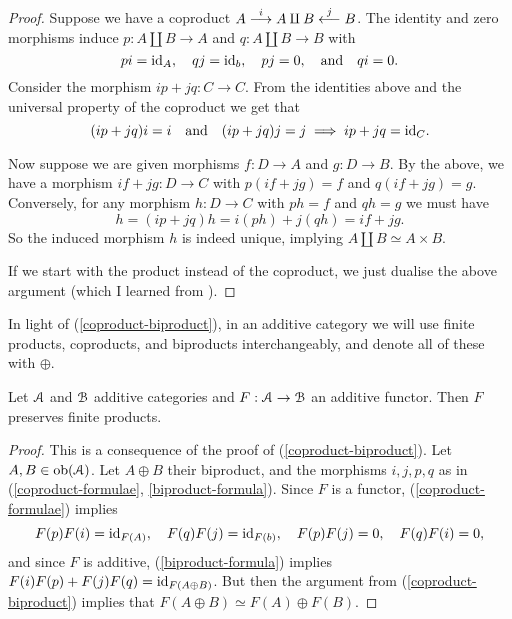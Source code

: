 \begin{proof}
  Suppose we have a coproduct $A \overset{i}{\longrightarrow} A \amalg B
  \overset{j}{\longleftarrow} B$. The identity and zero morphisms induce $p
  : A \amalg B \to A$ and $q : A \amalg B \to B$ with
  \begin{equation}
    \label{coproduct-formulae}
    pi = \mathrm{id}_A, \quad qj = \mathrm{id}_b, \quad pj = 0, \quad\text{and}\quad
    qi = 0.
  \end{equation}
  Consider the morphism $ip + jq : C \to C$. From the identities above
  and the universal property of the coproduct we get that
  \begin{equation}
    \label{biproduct-formula}
    (ip + jq)i = i \quad\text{and}\quad (ip+jq)j = j \implies ip+jq =
    \mathrm{id}_C.
  \end{equation}

  \medskip
  Now suppose we are given morphisms $f : D \to A$ and $g : D \to
  B$. By the above, we have a morphism $if + jg : D \to C$ with
  $p(if+jg) = f$ and $q(if+jg) = g$. Conversely, for any morphism $h :
  D \to C$ with $ph = f$ and $qh = g$ we must have
  \[
  h = (ip+jq)h = i(ph) + j(qh) = if + jg.
  \]
  So the induced morphism $h$ is indeed unique, implying $A \amalg B
  \simeq A \times B$.

  \medskip
  If we start with the product instead of the coproduct, we just
  dualise the above argument (which I learned from
  \cite{mo-additive-functor-direct-sum}).
\end{proof}

\begin{notation}
  In light of (\ref{coproduct-biproduct}), in an additive category we
  will use finite products, coproducts, and biproducts
  interchangeably, and denote all of these with $\oplus$.
\end{notation}

\begin{lemma}
  \label{additive-functor-preserves-products}
  Let $\mathcal{A}$ and $\mathcal{B}$ additive categories and $F : \mathcal{A} \to \mathcal{B}$ an
  additive functor. Then $F$ preserves finite products.
\end{lemma}

\begin{proof}
  This is a consequence of the proof of
  (\ref{coproduct-biproduct}). Let $A,B \in \operatorname{ob}(\mathcal{A})$. Let $A \oplus B$
  their biproduct, and the morphisms $i,j,p,q$ as in
  (\ref{coproduct-formulae}, \ref{biproduct-formula}). Since $F$ is a
  functor, (\ref{coproduct-formulae}) implies
  \[
  F(p)F(i) = \mathrm{id}_{F(A)}, \quad F(q)F(j) = \mathrm{id}_{F(b)}, \quad F(p)F(j) =
  0, \quad F(q)F(i) = 0,
  \]
  and since $F$ is additive, (\ref{biproduct-formula}) implies
  $F(i)F(p) + F(j)F(q) = \mathrm{id}_{F(A \oplus B)}$. But then the argument
  from (\ref{coproduct-biproduct}) implies that $F(A \oplus B) \simeq
  F(A) \oplus F(B)$.
\end{proof}

